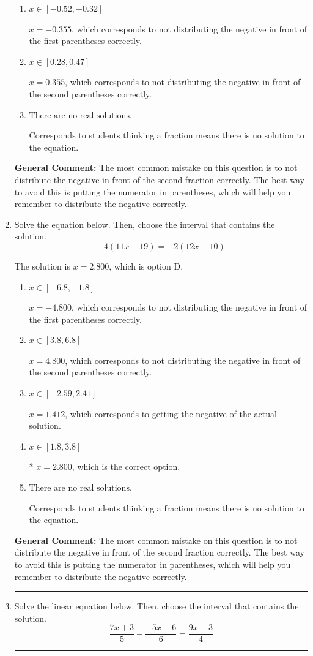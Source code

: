 \documentclass{extbook}[14pt]
\newcommand{\litem}[1]{\item #1

\rule{\textwidth}{0.4pt}}
\begin{document}
\begin{enumerate}
{\begin{enumerate}[label=\Alph*.]
* $x = -0.898$, which is the correct option.
\item \( x \in [-0.52, -0.32] \)

$x = -0.355$, which corresponds to not distributing the negative in front of the first parentheses correctly.
\item \( x \in [0.28, 0.47] \)

$x = 0.355$, which corresponds to not distributing the negative in front of the second parentheses correctly.
\item \( \text{There are no real solutions.} \)

Corresponds to students thinking a fraction means there is no solution to the equation.
\end{enumerate}

\textbf{General Comment:} The most common mistake on this question is to not distribute the negative in front of the second fraction correctly. The best way to avoid this is putting the numerator in parentheses, which will help you remember to distribute the negative correctly.
}
\litem{
Solve the equation below. Then, choose the interval that contains the solution.
\[ -4(11x -19) = -2(12x -10) \]

The solution is \( x = 2.800 \), which is option D.\begin{enumerate}[label=\Alph*.]
\item \( x \in [-6.8, -1.8] \)

$x = -4.800$, which corresponds to not distributing the negative in front of the first parentheses correctly.
\item \( x \in [3.8, 6.8] \)

$x = 4.800$, which corresponds to not distributing the negative in front of the second parentheses correctly.
\item \( x \in [-2.59, 2.41] \)

$x = 1.412$, which corresponds to getting the negative of the actual solution.
\item \( x \in [1.8, 3.8] \)

* $x = 2.800$, which is the correct option.
\item \( \text{There are no real solutions.} \)

Corresponds to students thinking a fraction means there is no solution to the equation.
\end{enumerate}

\textbf{General Comment:} The most common mistake on this question is to not distribute the negative in front of the second fraction correctly. The best way to avoid this is putting the numerator in parentheses, which will help you remember to distribute the negative correctly.
}
\litem{
Solve the linear equation below. Then, choose the interval that contains the solution.
\[ \frac{7x + 3}{5} - \frac{-5x -6}{6} = \frac{9x -3}{4} \]

}
\end{enumerate}
\end{document}
